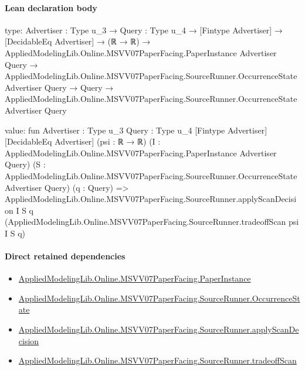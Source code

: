 \documentclass[10pt]{article}
\begin{document}
\paragraph{Lean declaration body}
\begin{ReviewVerbatim}
type:
{Advertiser : Type u_3} →
  {Query : Type u_4} →
    [Fintype Advertiser] →
      [DecidableEq Advertiser] →
        (ℝ → ℝ) →
          AppliedModelingLib.Online.MSVV07PaperFacing.PaperInstance Advertiser Query →
            AppliedModelingLib.Online.MSVV07PaperFacing.SourceRunner.OccurrenceState Advertiser Query →
              Query → AppliedModelingLib.Online.MSVV07PaperFacing.SourceRunner.OccurrenceState Advertiser Query

value:
fun {Advertiser : Type u_3} {Query : Type u_4} [Fintype Advertiser] [DecidableEq Advertiser] (psi : ℝ → ℝ)
    (I : AppliedModelingLib.Online.MSVV07PaperFacing.PaperInstance Advertiser Query)
    (S : AppliedModelingLib.Online.MSVV07PaperFacing.SourceRunner.OccurrenceState Advertiser Query) (q : Query) =>
  AppliedModelingLib.Online.MSVV07PaperFacing.SourceRunner.applyScanDecision I S q
    (AppliedModelingLib.Online.MSVV07PaperFacing.SourceRunner.tradeoffScan psi I S q)
\end{ReviewVerbatim}

\paragraph{Direct retained dependencies}
\begin{itemize}\raggedright
\item \hyperlink{governing-declaration-11907576ec71eeb5}{Applied\allowbreak{}Modeling\allowbreak{}Lib.\allowbreak{}Online.\allowbreak{}MSVV07\allowbreak{}Paper\allowbreak{}Facing.\allowbreak{}Paper\allowbreak{}Instance}
\item \hyperlink{governing-declaration-2eff7815f49c1d41}{Applied\allowbreak{}Modeling\allowbreak{}Lib.\allowbreak{}Online.\allowbreak{}MSVV07\allowbreak{}Paper\allowbreak{}Facing.\allowbreak{}Source\allowbreak{}Runner.\allowbreak{}Occurrence\allowbreak{}State}
\item \hyperlink{governing-declaration-630634ffcb66c6e1}{Applied\allowbreak{}Modeling\allowbreak{}Lib.\allowbreak{}Online.\allowbreak{}MSVV07\allowbreak{}Paper\allowbreak{}Facing.\allowbreak{}Source\allowbreak{}Runner.\allowbreak{}apply\allowbreak{}Scan\allowbreak{}Decision}
\item \hyperlink{governing-declaration-0d7ae7715942dda4}{Applied\allowbreak{}Modeling\allowbreak{}Lib.\allowbreak{}Online.\allowbreak{}MSVV07\allowbreak{}Paper\allowbreak{}Facing.\allowbreak{}Source\allowbreak{}Runner.\allowbreak{}tradeoff\allowbreak{}Scan}
\end{itemize}
\hypertarget{governing-declaration-d155a4a77f16f757}{}
\end{document}

